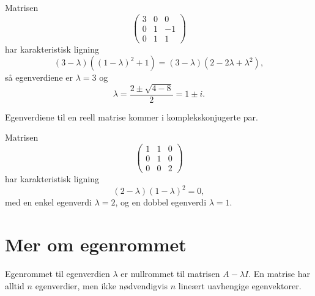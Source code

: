 \begin{ex}
Matrisen
\[
\begin{pmatrix}
3 & 0 & 0 \\ 0 & 1 & -1 \\ 0&  1 &1  
\end{pmatrix}
\]
har karakteristisk ligning
\[
(3-\lambda)((1-\lambda)^2+1)=(3-\lambda)(2-2\lambda+\lambda^2),
\]
så egenverdiene er $\lambda=3$ og
\[
\lambda=\frac{2\pm\sqrt{4-8}}{2}=1\pm i.
\] 
\end{ex}

\begin{thm}
Egenverdiene til en reell matrise kommer i komplekskonjugerte par.
\end{thm}


\begin{ex}
Matrisen
\[
\begin{pmatrix}
1 & 1 & 0\\  0 &1 & 0 \\ 0 & 0 & 2
\end{pmatrix}
\]
har karakteristisk ligning
\[
(2-\lambda)(1-\lambda)^2=0,
\]
med en enkel egenverdi $\lambda=2$, og en dobbel egenverdi $\lambda=1$. 
\end{ex}


\section*{Mer om egenrommet}
Egenrommet til egenverdien $\lambda$ er nullrommet til matrisen $A-\lambda I$.
En matrise har alltid $n$ egenverdier, 
men ikke nødvendigvis $n$ lineært uavhengige egenvektorer.


